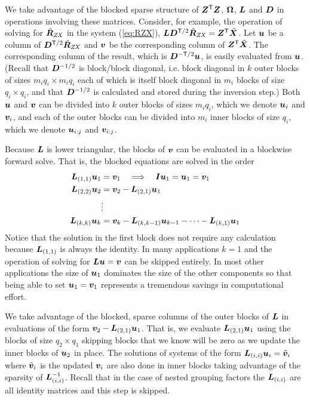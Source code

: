 \documentclass[12pt]{article}
\begin{document}
We take advantage of the blocked sparse structure of $\bm{Z}^\mathsf{T}\bm{Z}$,
$\bm{\Omega}$, $\bm{L}$ and $\bm{D}$ in operations involving these matrices.
Consider, for example, the operation of solving for $\tilde{\bm{R}}_\mathit{ZX}$ in the
system (\ref{eq:RZX}),
$\bm{L}\bm{D}^{\mathsf{T}/2}\tilde{\bm{R}}_\mathit{ZX}=\bm{Z}^\mathsf{T}\tilde{\bm{X}}$.  Let $\bm{u}$ be a
column of $\bm{D}^{\mathsf{T}/2}\tilde{\bm{R}}_\mathit{ZX}$ and $\bm{v}$ be the corresponding
column of $\bm{Z}^\mathsf{T}\tilde{\bm{X}}$.  The corresponding column of the
result, which is $\bm{D}^{-\mathsf{T}/2}\bm{u}$, is easily evaluated from
$\bm{u}$. (Recall that $\bm{D}^{-1/2}$ is block/block diagonal, i.e. block
diagonal in $k$ outer blocks of sizes $m_i q_i\times m_i q_i$ each of
which is itself block diagonal in $m_i$ blocks of size $q_i\times
q_i$, and that $\bm{D}^{-1/2}$ is calculated and stored during the
inversion step.)  Both $\bm{u}$ and $\bm{v}$ can be divided into $k$ outer
blocks of sizes $m_i q_i$, which we denote $\bm{u}_i$ and $\bm{v}_i$, and
each of the outer blocks can be divided into $m_i$ inner blocks of
size $q_i$, which we denote $\bm{u}_{i:j}$ and $\bm{v}_{i:j}$.

Because $\bm{L}$ is lower triangular, the blocks of $\bm{v}$ can be
evaluated in a blockwise forward solve.  That is, the blocked
equations are solved in the order
\begin{equation}
  \label{eq:blockwiseForward}
  \begin{aligned}
    \bm{L}_{(1,1)}\bm{u}_1 &= \bm{v}_1\quad\Longrightarrow\quad \bm{I}\bm{u}_1 =
    \bm{u}_1 = \bm{v}_1\\
    \bm{L}_{(2,2)}\bm{u}_2 &= \bm{v}_2-\bm{L}_{(2,1)}\bm{u}_1\\
    &\vdots\\
    \bm{L}_{(k,k)}\bm{u}_k &= \bm{v}_k-\bm{L}_{(k,k-1)}\bm{u}_{k-1}-\dots-\bm{L}_{(k,1)}\bm{u}_1
  \end{aligned}
\end{equation}
Notice that the solution in the first block does not require any
calculation because $\bm{L}_{(1,1)}$ is always the identity.  In many
applications $k=1$ and the operation of solving for $\bm{L}\bm{u}=\bm{v}$ can
be skipped entirely.  In most other applications the size of $\bm{u}_1$
dominates the size of the other components so that being able to set
$\bm{u}_1=\bm{v}_1$ represents a tremendous savings in computational effort.

We take advantage of the blocked, sparse columns of the outer blocks
of $\bm{L}$ in evaluations of the form $\bm{v}_2-\bm{L}_{(2,1)}\bm{u}_{1}$.  That
is, we evaluate $\bm{L}_{(2,1)}\bm{u}_{1}$ using the blocks of size
$q_2\times q_1$ skipping blocks that we know will be zero as we update
the inner blocks of $\bm{u}_2$ in place.  The solutions of systems of the
form $\bm{L}_{(i,i)}\bm{u}_i=\tilde{\bm{v}}_i$ where $\tilde{\bm{v}}_i$ is the
updated $\bm{v}_i$ are also done in inner blocks taking advantage of the
sparsity of $\bm{L}_{(i,i)}^{-1}$.  Recall that in the case of nested grouping
factors the $\bm{L}_{(i,i)}$ are all identity matrices and this step is
skipped.
\end{document}
